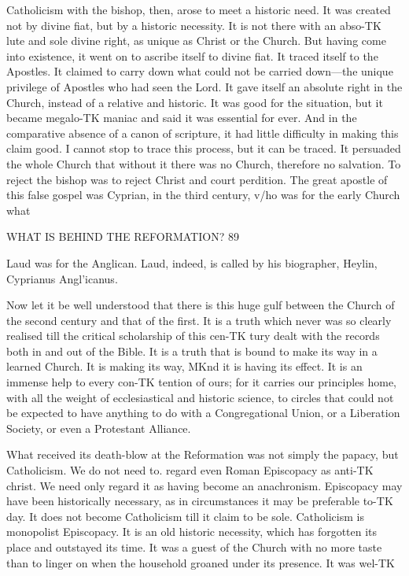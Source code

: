 \documentclass[12pt,a5paper,twoside]{book}
\begin{document}
Catholicism with the bishop, then, arose to meet a 
historic need. It was created not by divine fiat, but 
by a historic necessity. It is not there with an abso-TK
lute and sole divine right, as unique as Christ or the 
Church. But having come into existence, it went on 
to ascribe itself to divine fiat. It traced itself to the 
Apostles. It claimed to carry down what could not 
be carried down---the unique privilege of Apostles 
who had seen the Lord. It gave itself an absolute 
right in the Church, instead of a relative and historic. 
It was good for the situation, but it became megalo-TK
maniac and said it was essential for ever. And in 
the comparative absence of a canon of scripture, it 
had little difficulty in making this claim good. I 
cannot stop to trace this process, but it can be traced. 
It persuaded the whole Church that without it there 
was no Church, therefore no salvation. To reject 
the bishop was to reject Christ and court perdition. 
The great apostle of this false gospel was Cyprian, in 
the third century, v/ho was for the early Church what 



WHAT IS BEHIND THE REFORMATION? 89 

Laud was for the Anglican. Laud, indeed, is called 
by his biographer, Heylin, Cyprianus Angl'icanus. 

Now let it be well understood that there is this huge 
gulf between the Church of the second century and 
that of the first. It is a truth which never was so 
clearly realised till the critical scholarship of this cen-TK
tury dealt with the records both in and out of the 
Bible. It is a truth that is bound to make its way in 
a learned Church. It is making its way, MKnd it is 
having its effect. It is an immense help to every con-TK
tention of ours; for it carries our principles home, 
with all the weight of ecclesiastical and historic 
science, to circles that could not be expected to have 
anything to do with a Congregational Union, or a 
Liberation Society, or even a Protestant Alliance. 

What received its death-blow at the Reformation 
was not simply the papacy, but Catholicism. We do 
not need to. regard even Roman Episcopacy as anti-TK
christ. We need only regard it as having become an 
anachronism. Episcopacy may have been historically 
necessary, as in circumstances it may be preferable to-TK
day. It does not become Catholicism till it claim to be 
sole. Catholicism is monopolist Episcopacy. It is an 
old historic necessity, which has forgotten its place 
and outstayed its time. It was a guest of the Church 
with no more taste than to linger on when the 
household groaned under its presence. It was wel-TK
\end{document}
